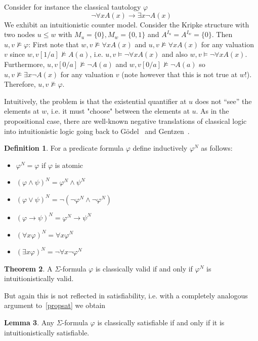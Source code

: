 \documentclass[a4paper,11pt]{report}
\theoremstyle{definition}
\newtheorem{theorem}{Theorem}[section]
\theoremstyle{definition}
\theoremstyle{definition}
\newtheorem{lemma}[theorem]{Lemma}
\theoremstyle{definition}
\theoremstyle{definition}
\newtheorem{definition}[theorem]{Definition}
\theoremstyle{definition}
\theoremstyle{definition}
\begin{document}
	Consider for instance the classical tautology $\varphi$ $$\neg\forall x A(x)\to \exists x \neg A(x)$$We exhibit an intuitionistic counter model. Consider the Kripke structure with two nodes $u\leq w$ with $M_u = \{0\}, M_w = \{0, 1\}$ and $A^{I_u} = A^{I_w} = \{0\}$. Then $u, v\not\models \varphi$: First note that $w, v\not\models\forall xA(x)$ and $u, v\not\models\forall xA(x)$ for any valuation $v$ since $w, v[1/a]\not\models A(a)$, i.e. $u, v\models\neg\forall xA(x)$ and also $w, v\models\neg\forall xA(x)$. Furthermore, $u, v[0/a]\not\models \neg A(a)$ and $w, v[0/a]\not\models \neg A(a)$ so $u, v\not\models \exists x\neg A(x)$ for any valuation $v$ (note however that this is not true at $w$!). Therefore, $u, v\not\models\varphi$.
	
	Intuitively, the problem is that the existential quantifier at $u$ does not ``see'' the elements at $w$, i.e. it must "choose" between the elements at $u$. As in the propositional case, there are well-known negative translations of classical logic into intuitionistic logic going back to G\"odel~\cite{godel1933intuitionistischen} and Gentzen~\cite{gentzen1936widerspruchsfreiheit}.
	
	\begin{definition}
		For a predicate formula $\varphi$ define inductively $\varphi^N$ as follows:
		\begin{itemize}
			\item $\varphi^N = \varphi$ if $\varphi$ is atomic
			\item $(\varphi\wedge\psi)^N = \varphi^N\wedge\psi^N$
			\item $(\varphi\vee\psi)^N = \neg(\neg\varphi^N\wedge\neg\varphi^N)$
			\item $(\varphi\to\psi)^N = \varphi^N\to\psi^N$
			\item $(\forall x\varphi)^N = \forall x\varphi^N$
			\item $(\exists x\varphi)^N = \neg\forall x\neg\varphi^N$
		\end{itemize}
	\end{definition}
	\begin{theorem}
		A $\Sigma$-formula $\varphi$ is classically valid if and only if $\varphi^N$ is intuitionistically valid.
	\end{theorem}
	
	But again this is not reflected in satisfiability, i.e. with a completely analogous argument to~\ref{propsat} we obtain
	
	\begin{lemma}
		Any $\Sigma$-formula $\varphi$ is classically satisfiable if and only if it is intuitionistically satisfiable.
	\end{lemma}
	
\end{document}
